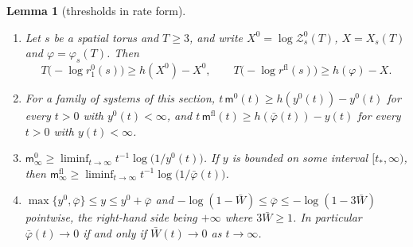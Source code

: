 \documentclass[11pt,a4paper]{amsart}
\newtheorem{lemma}[theorem]{Lemma}
\theoremstyle{definition}
\theoremstyle{remark}
\numberwithin{equation}{section}
\newcommand{\TT}{\mathbb{T}}               %
\newcommand{\Zc}{\mathcal{Z}}              %
\newcommand{\XT}[2]{X_{#1}(#2)}            %
\begin{document}
\begin{lemma}[thresholds in rate form]\label{lem:sector-thresholds}
\begin{enumerate}[label=\textup{(\alph*)},leftmargin=*]
\item Let $s$ be a spatial torus and $T\ge3$, and write $X^0=\log\Zc^0_s(T)$, $X=\XT{s}{T}$ and $\varphi=\varphi_s(T)$. Then
\[
T\bigl(-\log r_1^0(s)\bigr)\ge h(X^0)-X^0,\qquad T\bigl(-\log r^{\mathrm{fl}}(s)\bigr)\ge h(\varphi)-X .
\]
\item For a family of systems of this section, $t\,\mathsf m^0(t)\ge h(y^0(t))-y^0(t)$ for every $t>0$ with $y^0(t)<\infty$, and $t\,\mathsf m^{\mathrm{fl}}(t)\ge h(\bar\varphi(t))-y(t)$ for every $t>0$ with $y(t)<\infty$.
\item $\mathsf m^0_\infty\ge\liminf_{t\to\infty}t^{-1}\log\bigl(1/y^0(t)\bigr)$. If $y$ is bounded on some interval $[t_*,\infty)$, then $\mathsf m^{\mathrm{fl}}_\infty\ge\liminf_{t\to\infty}t^{-1}\log\bigl(1/\bar\varphi(t)\bigr)$.
\item $\max\{y^0,\bar\varphi\}\le y\le y^0+\bar\varphi$ and $-\log(1-\bar W)\le\bar\varphi\le-\log(1-3\bar W)$ pointwise, the right-hand side being $+\infty$ where $3\bar W\ge1$. In particular $\bar\varphi(t)\to0$ if and only if $\bar W(t)\to0$ as $t\to\infty$.
\end{enumerate}
\end{lemma}
\end{document}

